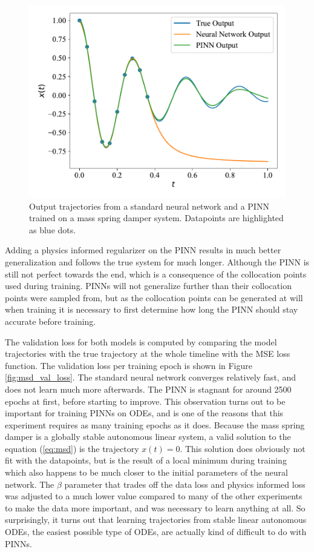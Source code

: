 \begin{figure}[H]
    \centering
    \includegraphics[width=1.0\linewidth]{Figures/InitialExperiments/msd.pdf}
    \caption{Output trajectories from a standard neural network and a PINN trained on a mass spring damper system. Datapoints are highlighted as blue dots.}
    \label{fig:msd}
\end{figure}

Adding a physics informed regularizer on the PINN results in much better generalization and follows the true system for much longer. Although the PINN is still not perfect towards the end, which is a consequence of the collocation points used during training. PINNs will not generalize further than their collocation points were sampled from, but as the collocation points can be generated at will when training it is necessary to first determine how long the PINN should stay accurate before training.

The validation loss for both models is computed by comparing the model trajectories with the true trajectory at the whole timeline with the MSE loss function. The validation loss per training epoch is shown in Figure \ref{fig:msd_val_loss}. The standard neural network converges relatively fast, and does not learn much more afterwards. The PINN is stagnant for around 2500 epochs at first, before starting to improve. This observation turns out to be important for training PINNs on ODEs, and is one of the reasons that this experiment requires as many training epochs as it does. Because the mass spring damper is a globally stable autonomous linear system, a valid solution to the equation (\ref{eq:msd}) is the trajectory $x(t) = 0$. This solution does obviously not fit with the datapoints, but is the result of a local minimum during training which also happens to be much closer to the initial parameters of the neural network. The $\beta$ parameter that trades off the data loss and physics informed loss was adjusted to a much lower value compared to many of the other experiments to make the data more important, and was necessary to learn anything at all. So surprisingly, it turns out that learning trajectories from stable linear autonomous ODEs, the easiest possible type of ODEs, are actually kind of difficult to do with PINNs.

